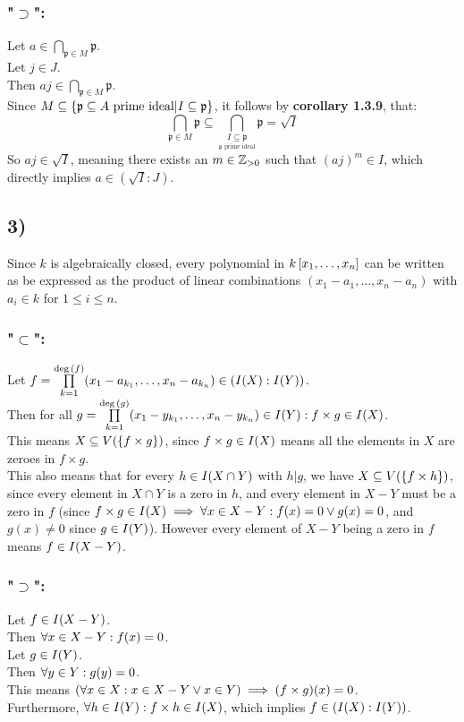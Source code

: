 \documentclass[a4paper]{scrartcl}
\begin{document}
\subsubsection*{"$\supset$":}
Let $a\in\underset{\mathfrak{p}\in M}{\bigcap}\mathfrak{p}$.\\
Let $j\in J$.\\
Then $aj\in\underset{\mathfrak{p}\in M}{\bigcap}\mathfrak{p}$.\\
Since $M\subseteq\left\lbrace \mathfrak{p}\subseteq A\text{ prime ideal}|I\subseteq\mathfrak{p} \right\rbrace$, it follows by \textbf{corollary 1.3.9}, that:
\[\underset{\mathfrak{p}\in M}{\bigcap}\mathfrak{p}\subseteq\underset{\underset{\mathfrak{p}\text{ prime ideal}}{I\subseteq\mathfrak{p}}}{\bigcap}\mathfrak{p}=\sqrt{I}\]
So $aj\in\sqrt{I}$, meaning there exists an $m\in\mathbb{Z}_{>0}$ such that $(aj)^m\in I$, which directly implies $a\in(\sqrt{I}:J)$.
\subsection*{3)}
Since $k$ is algebraically closed, every polynomial in $k\left[ x_1,\dots,x_n \right]$ can be written as be expressed as the product of linear combinations $(x_1-a_1,\dots,x_n-a_n)$ with $a_i\in k$ for $1\leq i\leq n$.
\subsubsection*{"$\subset$":}
Let $f=\underset{k=1}{\overset{\deg{\left( f \right)}}{\prod}}(x_1-a_{k_1},\dots,x_n-a_{k_n})\in(I{\left( X \right)}:I{\left( Y \right)})$.\\
Then for all $g=\underset{k=1}{\overset{\deg{\left( g \right)}}{\prod}}(x_1-y_{k_1},\dots,x_n-y_{k_n})\in I{\left( Y \right)}:f\times g\in I{\left( X \right)}$.\\
This means $X\subseteq V{\left( \left\lbrace f\times g \right\rbrace \right)}$, since $f\times g\in I{\left( X \right)}$ means all the elements in $X$ are zeroes in $f\times g$.\\
This also means that for every $h\in I{\left( X\cap Y \right)}$ with $h|g$, we have $X\subseteq V{\left( \left\lbrace f\times h \right\rbrace \right)}$, since every element in $X\cap Y$ is a zero in $h$, and every element in $X-Y$ must be a zero in $f$ (since $f\times g\in I{\left( X \right)}\implies\forall x\in X-Y:f(x)=0\vee g(x)=0$, and $g(x)\neq0$ since $g\in I{\left( Y \right)}$).
However every element of $X-Y$ being a zero in $f$ means $f\in I{\left( X-Y \right)}$.
\subsubsection*{"$\supset$":}
Let $f\in I{\left( X-Y \right)}$.\\
Then $\forall x\in X-Y:f{\left( x \right)}=0$.\\
Let $g\in I{\left( Y \right)}$.\\
Then $\forall y\in Y:g{\left( y \right)}=0$.\\
This means $(\forall x\in X:x\in X-Y\vee x\in Y)\implies (f\times g){\left( x \right)}=0$.\\
Furthermore, $\forall h\in I{\left( Y \right)}:f\times h\in I{\left( X \right)}$, which implies $f\in(I{\left( X \right)}:I{\left( Y \right)})$.
\end{document}

